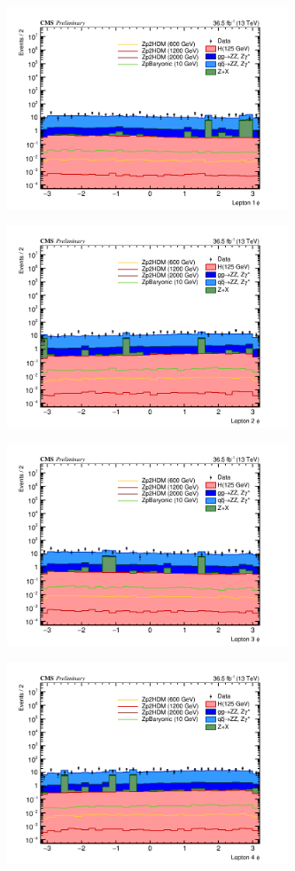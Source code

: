 \begin{figure}[tbh]
\begin{subfigure}{0.50\textwidth}
\centering
\includegraphics[width=3.3in]{figures/hist_hlept1_phi_CR.png}
\caption{}
\end{subfigure}
\begin{subfigure}{0.50\textwidth}
\centering
\includegraphics[width=3.3in]{figures/hist_hlept2_phi_CR.png}
\caption{}
\end{subfigure}
\begin{subfigure}{0.50\textwidth}
\centering
\includegraphics[width=3.3in]{figures/hist_hlept3_phi_CR.png}
\caption{}
\end{subfigure}
\begin{subfigure}{0.50\textwidth}
\centering
\includegraphics[width=3.3in]{figures/hist_hlept4_phi_CR.png}

\end{subfigure}
\end{figure}
